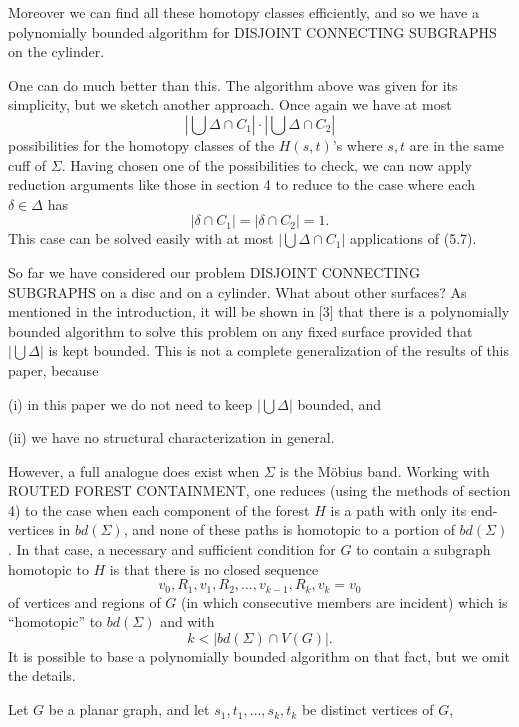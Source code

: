 Moreover we can find all these homotopy classes efficiently, and so we have a polynomially bounded algorithm for DISJOINT CONNECTING SUBGRAPHS on the cylinder.

One can do much better than this. The algorithm above was given for its simplicity, but we sketch another approach. Once again we have at most
\begin{equation*}
\left| \bigcup \Delta \cap C_1 \right| \cdot \left| \bigcup \Delta \cap C_2 \right|
\end{equation*}
possibilities for the homotopy classes of the $H(s, t)$'s where $s, t$ are in the same cuff of $\Sigma$. Having chosen one of the possibilities to check, we can now apply reduction arguments like those in section 4 to reduce to the case where each $\delta \in \Delta$ has
\begin{equation*}
|\delta \cap C_1| = |\delta \cap C_2| = 1.
\end{equation*}
This case can be solved easily with at most $|\bigcup \Delta \cap C_1|$ applications of (5.7).

So far we have considered our problem DISJOINT CONNECTING SUBGRAPHS on a disc and on a cylinder. What about other surfaces? As mentioned in the introduction, it will be shown in [3] that there is a polynomially bounded algorithm to solve this problem on any fixed surface provided that $|\bigcup \Delta|$ is kept bounded. This is not a complete generalization of the results of this paper, because

\hspace*{12pt}(i) in this paper we do not need to keep $|\bigcup \Delta|$ bounded, and

\hspace*{12pt}(ii) we have no structural characterization in general.

However, a full analogue does exist when $\Sigma$ is the M\"obius band. Working with ROUTED FOREST CONTAINMENT, one reduces (using the methods of section 4) to the case when each component of the forest $H$ is a path with only its end-vertices in $bd(\Sigma)$, and none of these paths is homotopic to a portion of $bd(\Sigma)$. In that case, a necessary and sufficient condition for $G$ to contain a subgraph homotopic to $H$ is that there is no closed sequence
\begin{equation*}
v_0, R_1, v_1, R_2, \dots, v_{k-1}, R_k, v_k = v_0
\end{equation*}
of vertices and regions of $G$ (in which consecutive members are incident) which is ``homotopic'' to $bd(\Sigma)$ and with
\begin{equation*}
k < |bd(\Sigma) \cap V(G)|.
\end{equation*}
It is possible to base a polynomially bounded algorithm on that fact, but we omit the details.

Let $G$ be a planar graph, and let $s_1, t_1, \dots, s_k, t_k$ be distinct vertices of $G$,
